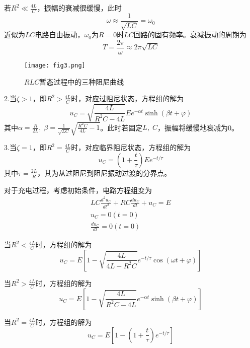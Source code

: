 \documentclass[UTF-8,twoside,cs4size]{ctexart}
\begin{document}
	若$ R^2\ll\frac{4L}{C} $，振幅的衰减很缓慢，此时
	\begin{equation}
        \omega\approx\frac{1}{\sqrt{LC}}=\omega_0
    \end{equation}
	近似为$ LC $电路自由振动，$ \omega_0 $为$ R=0 $时$ LC $回路的固有频率。衰减振动的周期为
	\begin{equation}
        T=\frac{2\pi}{\omega}\approx2\pi\sqrt{LC}
    \end{equation}
\begin{figure}[!h]
    \centering
    \texttt{[image: fig3.png]}
    \caption{$ RLC $暂态过程中的三种阻尼曲线}
\end{figure}
2.当$ \zeta>1 $，即$ R^2>\frac{4L}{C} $时，对应过阻尼状态，方程组的解为
\begin{equation}
    u_C=\sqrt{\frac{4L}{R^2C-4L}}Ee^{-\alpha t}\sinh(\beta t+\varphi)
\end{equation}
	其中$ \alpha=\frac{R}{2L},\;\beta=\frac{1}{\sqrt{LC}}\sqrt{\frac{R^2C}{4L}-1} $。此时若固定$ L,\;C $，振幅将缓慢地衰减为0。
	
	3.当$ \zeta=1 $，即$ R^2=\frac{4L}{C} $时，对应临界阻尼状态，方程组的解为
    \begin{equation}
        u_C=\left(1+\frac t\tau\right)Ee^{-t/\tau}
    \end{equation}
	其中$ \tau=\frac{2L}{R} $，其为从过阻尼到阻尼振动过渡的分界点。
	
	对于充电过程，考虑初始条件，电路方程组变为
    \begin{align}
        LC\frac{d^2u_C}{dt^2} + RC\frac{du_C}{dt} + u_C = E\\
        u_C = 0 (t = 0)\\
        \frac{du_C}{dt} = 0 (t = 0)
    \end{align}

	当$ R^2<\frac{4L}{C} $时，方程组的解为
    \begin{equation}
        u_C=E\left[1-\sqrt{\frac{4L}{4L-R^2C}}e^{-t/\tau}\cos(\omega t+\varphi)\right]
    \end{equation}
	
	当$ R^2>\frac{4L}{C} $时，方程组的解为
    \begin{equation}
        u_C=E\left[1-\sqrt{\frac{4L}{R^2C-4L}}e^{-\alpha t}\sinh(\beta t+\varphi)\right]
    \end{equation}
	
	当$ R^2=\frac{4L}{C} $时，方程组的解为
    \begin{equation}
        u_C=E\left[1-\left(1+\frac t\tau\right)e^{-t/\tau}\right]
    \end{equation}
	
\end{document}
